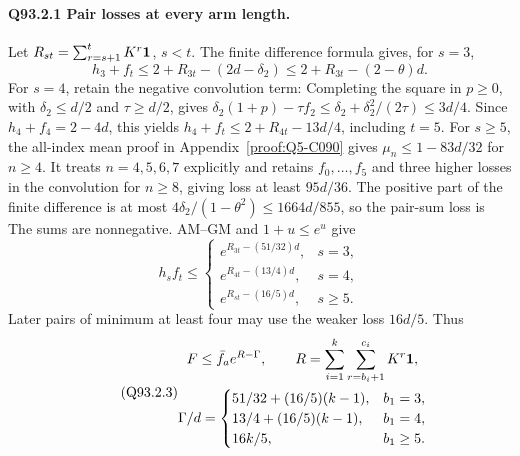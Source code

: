 \paragraph{Q93.2.1 Pair losses at every arm length.}
Let \(R_{st}=\sum_{r=s+1}^tK^r\mathbf1\), \(s<t\).
The finite difference formula gives, for \(s=3\),
\begin{equation}\tag{Q93.2.1}\label{eq:Q93:2.1}
h_3+f_t\le2+R_{3t}-(2d-\delta_2)
\le2+R_{3t}-(2-\theta)d.
\end{equation}
For \(s=4\), retain the negative convolution term:
Completing the square in \(p\ge0\), with \(\delta_2\le d/2\) and
\(\tau\ge d/2\), gives
\(\delta_2(1+p)-\tau f_2\le\delta_2+\delta_2^2/(2\tau)\le3d/4\).
Since \(h_4+f_4=2-4d\), this yields
\(h_4+f_t\le2+R_{4t}-13d/4\), including \(t=5\).
For \(s\ge5\), the all-index mean proof in
Appendix~\ref{proof:Q5-C090} gives \(\mu_n\le1-83d/32\) for \(n\ge4\).
It treats \(n=4,5,6,7\) explicitly and retains \(f_0,\ldots,f_5\) and
three higher losses in the convolution for \(n\ge8\), giving loss at
least \(95d/36\). The positive part of the finite difference is at
most \(4\delta_2/(1-\theta^2)\le1664d/855\), so the pair-sum loss is
The sums are nonnegative. AM--GM and \(1+u\le e^u\) give
\begin{equation}\tag{Q93.2.2}\label{eq:Q93:2.2}
h_sf_t\le
\begin{cases}
e^{R_{3t}-(51/32)d},&s=3,\\
e^{R_{4t}-(13/4)d},&s=4,\\
e^{R_{st}-(16/5)d},&s\ge5.
\end{cases}
\end{equation}
Later pairs of minimum at least four may use the weaker loss \(16d/5\).
Thus
\begin{equation}\tag{Q93.2.3}\label{eq:Q93:2.3}
\begin{gathered}
F\le\bar f_ae^{R-\Gamma},\qquad
R=\sum_{i=1}^k\sum_{r=b_i+1}^{c_i}K^r\mathbf1,\\
\Gamma/d=\begin{cases}
51/32+(16/5)(k-1),&b_1=3,\\
13/4+(16/5)(k-1),&b_1=4,\\
16k/5,&b_1\ge5.
\end{cases}
\end{gathered}
\end{equation}

